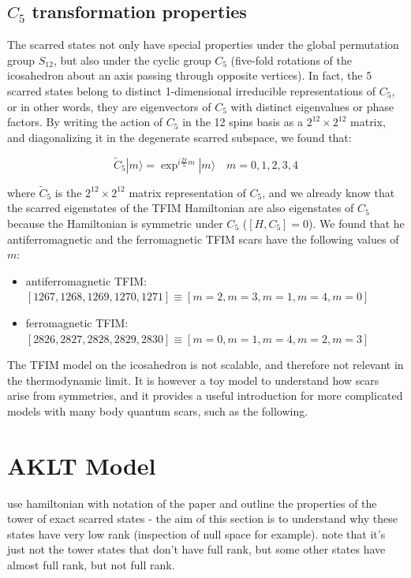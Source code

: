 \documentclass{article}
\begin{document}
\subsection{$C_5$ transformation properties}

The scarred states not only have special properties under the global permutation group $S_{12}$, but also under the cyclic group $C_5$ (five-fold rotations of the icosahedron about an axis passing through opposite vertices). In fact, the 5 scarred states belong to distinct 1-dimensional irreducible representations of $C_5$, or in other words, they are eigenvectors of $C_5$ with distinct eigenvalues or phase factors. By writing the action of $C_5$ in the 12 spins basis as a $2^{12}\times2^{12}$ matrix, and diagonalizing it in the degenerate scarred subspace, we found that:

\begin{equation}
\tilde{C}_5 |m\rangle = \exp^{i \frac{2\pi}{5} m} |m\rangle \quad m = 0,1,2,3,4
\end{equation} 

where $\tilde{C}_5$ is the $2^{12}\times2^{12}$ matrix representation of $C_5$, and we already know that the scarred eigenstates of the TFIM Hamiltonian are also eigenstates of $C_5$ because the Hamiltonian is symmetric under $C_5$ ($[H,C_5]=0$). We found that he antiferromagnetic and the ferromagnetic TFIM scars have the following values of $m$:

\begin{itemize}

\item antiferromagnetic TFIM: $[1267,1268,1269,1270,1271] \equiv [m=2,m=3,m=1,m=4,m=0]$

\item ferromagnetic TFIM: $[2826,2827,2828,2829, 2830] \equiv [m=0,m=1,m=4,m=2,m=3]$

\end{itemize}


The TFIM model on the icosahedron is not scalable, and therefore not relevant in the thermodynamic limit. It is however a toy model to understand how scars arise from symmetries, and it provides a useful introduction for more complicated models with many body quantum scars, such as the following.

\section{AKLT Model}

use hamiltonian with notation of the paper and outline the properties of the tower of exact scarred states - the aim of this section is to understand why these states have very low rank (inspection of null space for example). note that it's just not the tower states that don't have full rank, but some other states have almost full rank, but not full rank.
\end{document}
